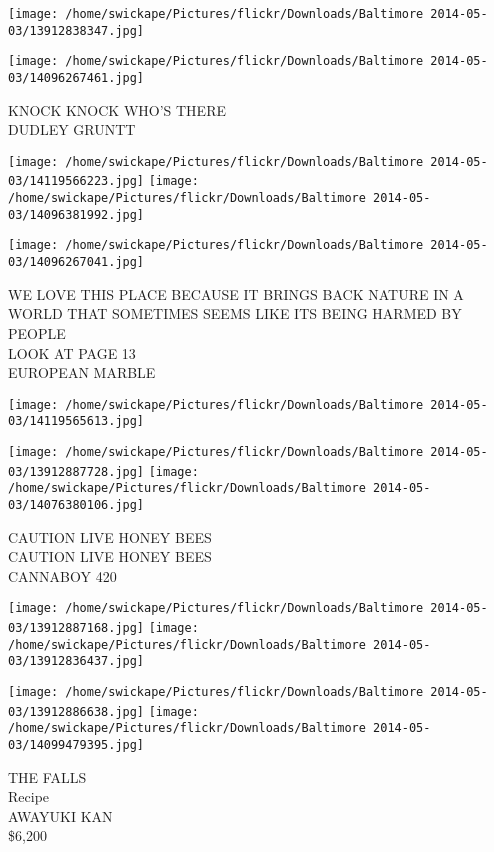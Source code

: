 \documentclass[10pt,letterpaper]{article}
\begin{document}
\texttt{[image: /home/swickape/Pictures/flickr/Downloads/Baltimore 2014-05-03/13912838347.jpg]}

\vspace{0.25in}
\texttt{[image: /home/swickape/Pictures/flickr/Downloads/Baltimore 2014-05-03/14096267461.jpg]}

KNOCK KNOCK WHO'S THERE\\
DUDLEY GRUNTT\\
\pagebreak

\texttt{[image: /home/swickape/Pictures/flickr/Downloads/Baltimore 2014-05-03/14119566223.jpg]}
\texttt{[image: /home/swickape/Pictures/flickr/Downloads/Baltimore 2014-05-03/14096381992.jpg]}

\vspace{0.25in}
\texttt{[image: /home/swickape/Pictures/flickr/Downloads/Baltimore 2014-05-03/14096267041.jpg]}

WE LOVE THIS PLACE BECAUSE IT BRINGS BACK NATURE IN A WORLD THAT SOMETIMES SEEMS LIKE ITS BEING HARMED BY PEOPLE\\
LOOK AT PAGE 13\\
EUROPEAN MARBLE\\
\pagebreak

\texttt{[image: /home/swickape/Pictures/flickr/Downloads/Baltimore 2014-05-03/14119565613.jpg]}

\vspace{0.25in}
\texttt{[image: /home/swickape/Pictures/flickr/Downloads/Baltimore 2014-05-03/13912887728.jpg]}
\texttt{[image: /home/swickape/Pictures/flickr/Downloads/Baltimore 2014-05-03/14076380106.jpg]}

CAUTION LIVE HONEY BEES\\
CAUTION LIVE HONEY BEES\\
CANNABOY 420\\
\pagebreak

\texttt{[image: /home/swickape/Pictures/flickr/Downloads/Baltimore 2014-05-03/13912887168.jpg]}
\texttt{[image: /home/swickape/Pictures/flickr/Downloads/Baltimore 2014-05-03/13912836437.jpg]}

\texttt{[image: /home/swickape/Pictures/flickr/Downloads/Baltimore 2014-05-03/13912886638.jpg]}
\texttt{[image: /home/swickape/Pictures/flickr/Downloads/Baltimore 2014-05-03/14099479395.jpg]}

THE FALLS\\
Recipe\\
AWAYUKI KAN\\
\$6,200\\
\pagebreak
\end{document}
